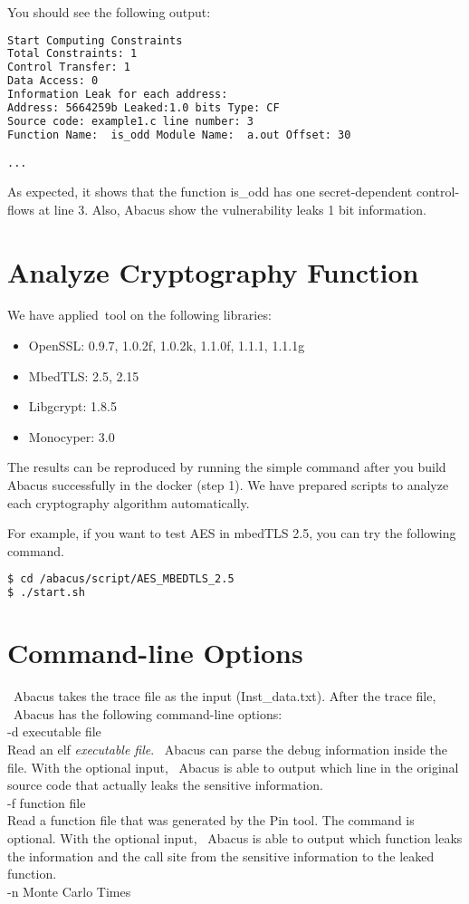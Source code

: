 \documentclass[10pt,conference]{IEEEtran}
\newcommand{\tool}{\textsf{Abacus}}
\begin{document}
You should see the following output:

\begin{lstlisting}[language=bash]
Start Computing Constraints
Total Constraints: 1
Control Transfer: 1
Data Access: 0
Information Leak for each address:
Address: 5664259b Leaked:1.0 bits Type: CF  
Source code: example1.c line number: 3
Function Name:  is_odd Module Name:  a.out Offset: 30

...
\end{lstlisting}

As expected, it shows that the function is\_odd has one secret-dependent control-flows at line 3. Also, Abacus show the vulnerability leaks 1 bit information.

\section{Analyze Cryptography Function}
We have applied~tool{} on the following libraries:
\begin{itemize}
\item OpenSSL: 0.9.7, 1.0.2f, 1.0.2k, 1.1.0f, 1.1.1, 1.1.1g
\item MbedTLS: 2.5, 2.15
\item Libgcrypt: 1.8.5
\item Monocyper: 3.0
\end{itemize}

The results can be reproduced by running the simple command after you build Abacus successfully in the docker (step 1). We have prepared scripts to analyze each cryptography algorithm automatically.

For example, if you want to test AES in mbedTLS 2.5, you can try the 
following command.

\begin{lstlisting}[language=bash]
$ cd /abacus/script/AES_MBEDTLS_2.5
$ ./start.sh
\end{lstlisting}

\section{Command-line Options}
~\tool{} takes the trace file as the input (\textsf{Inst\_data.txt}). After the trace file, ~\tool{} has the following command-line options:
\vspace{5pt}
\\-d {executable file}
\\Read an elf \textit{executable file}. ~\tool{} can parse the debug information inside the file. With the optional input, ~\tool{} is able to output which line in the original source code that actually leaks the sensitive information.
\vspace{5pt}
\\-f {function file}
\\Read a function file that was generated by the Pin tool. The command is optional. With the optional input, ~\tool{} is able to output which function leaks the information and the call site from the sensitive information to the leaked function.
\\-n {Monte Carlo Times}
\\
\end{document}
